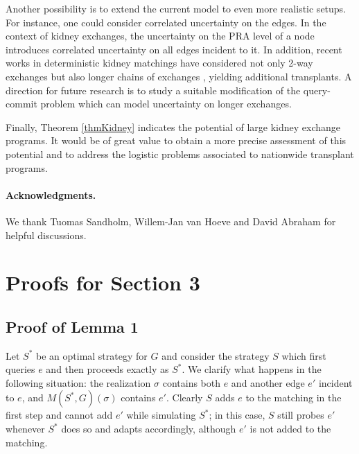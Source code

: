 \documentclass[12pt]{article}
\newcommand{\Mf}[2]{M(#1,#2)}
\newcommand{\pendantFirst}[0]{1}
\begin{document}
		Another possibility is to extend the current model to even more realistic setups. For instance, one could consider correlated uncertainty on the edges. In the context of kidney exchanges, the uncertainty on the PRA level of a node introduces correlated uncertainty on all edges incident to it. In addition, recent works in deterministic kidney matchings have considered not only 2-way exchanges but also longer chains of exchanges \cite{david, roth3}, yielding additional transplants. A direction for future research is to study a suitable modification of the query-commit problem which can model uncertainty on longer exchanges. 
		
		Finally, Theorem \ref{thmKidney} indicates the potential of large kidney exchange programs. It would be of great value to obtain a more precise assessment of this potential and to address the logistic problems associated to nationwide transplant programs. 
		
	\paragraph{Acknowledgments.} We thank Tuomas Sandholm, Willem-Jan van Hoeve and David Abraham for helpful discussions.
			





		
	\appendix

	\section{Proofs for Section 3}
	
	\subsection{Proof of Lemma \pendantFirst}
	
		Let $S^*$ be an optimal strategy for $G$ and consider the strategy $S$ which first queries $e$ and then proceeds exactly as $S^*$. We clarify what happens in the following situation: the realization $\sigma$ contains both $e$ and another edge $e'$ incident to $e$, and $\Mf{S^*}{G}(\sigma)$ contains $e'$. Clearly $S$ adds $e$ to the matching in the first step and cannot add $e'$ while simulating $S^*$; in this case, $S$ still probes $e'$ whenever $S^*$ does so and adapts accordingly, although $e'$ is not added to the matching. 
		
\end{document}
